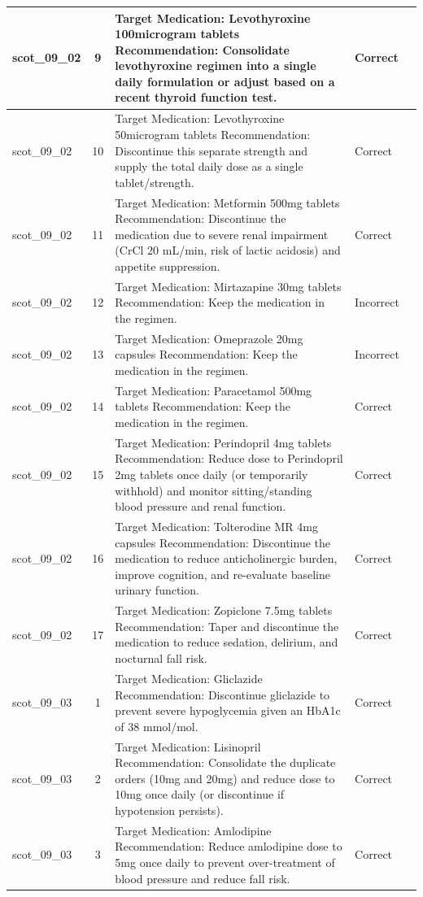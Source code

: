 \begin{longtable}{|p{1.45cm}|c|p{10.2cm}|p{1.55cm}|p{2.3cm}|}
\hline
scot\_09\_02 & 9 & Target Medication: Levothyroxine 100microgram tablets Recommendation: Consolidate levothyroxine regimen into a single daily formulation or adjust based on a recent thyroid function test. & Correct &  \\
\hline
scot\_09\_02 & 10 & Target Medication: Levothyroxine 50microgram tablets Recommendation: Discontinue this separate strength and supply the total daily dose as a single tablet/strength. & Correct &  \\
\hline
scot\_09\_02 & 11 & Target Medication: Metformin 500mg tablets Recommendation: Discontinue the medication due to severe renal impairment (CrCl 20 mL/min, risk of lactic acidosis) and appetite suppression. & Correct &  \\
\hline
scot\_09\_02 & 12 & Target Medication: Mirtazapine 30mg tablets Recommendation: Keep the medication in the regimen. & Incorrect &  \\
\hline
scot\_09\_02 & 13 & Target Medication: Omeprazole 20mg capsules Recommendation: Keep the medication in the regimen. & Incorrect &  \\
\hline
scot\_09\_02 & 14 & Target Medication: Paracetamol 500mg tablets Recommendation: Keep the medication in the regimen. & Correct &  \\
\hline
scot\_09\_02 & 15 & Target Medication: Perindopril 4mg tablets Recommendation: Reduce dose to Perindopril 2mg tablets once daily (or temporarily withhold) and monitor sitting/standing blood pressure and renal function. & Correct &  \\
\hline
scot\_09\_02 & 16 & Target Medication: Tolterodine MR 4mg capsules Recommendation: Discontinue the medication to reduce anticholinergic burden, improve cognition, and re-evaluate baseline urinary function. & Correct &  \\
\hline
scot\_09\_02 & 17 & Target Medication: Zopiclone 7.5mg tablets Recommendation: Taper and discontinue the medication to reduce sedation, delirium, and nocturnal fall risk. & Correct &  \\
\hline
scot\_09\_03 & 1 & Target Medication: Gliclazide Recommendation: Discontinue gliclazide to prevent severe hypoglycemia given an HbA1c of 38 mmol/mol. & Correct &  \\
\hline
scot\_09\_03 & 2 & Target Medication: Lisinopril Recommendation: Consolidate the duplicate orders (10mg and 20mg) and reduce dose to 10mg once daily (or discontinue if hypotension persists). & Correct &  \\
\hline
scot\_09\_03 & 3 & Target Medication: Amlodipine Recommendation: Reduce amlodipine dose to 5mg once daily to prevent over-treatment of blood pressure and reduce fall risk. & Correct &  \\

\end{longtable}
